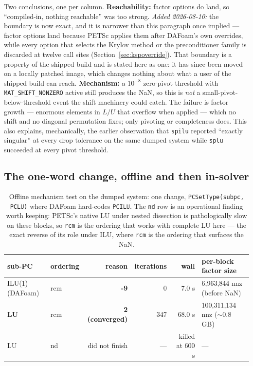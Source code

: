\documentclass[11pt,a4paper]{article}
\begin{document}
Two conclusions, one per column. \textbf{Reachability:} factor options do land, so
``compiled-in, nothing reachable'' was too strong. \emph{Added 2026-08-10:} the boundary is now
exact, and it is narrower than this paragraph once implied --- factor options land because
PETSc applies them after DAFoam's own overrides, while every option that selects the Krylov
method or the preconditioner family is discarded at twelve call sites
(Section~\ref{sec:kspoverride}). That boundary is a property of the shipped build and is stated
here as one: it has since been moved on a locally patched image, which changes nothing about
what a user of the shipped build can reach. \textbf{Mechanism:} a \(10^{-8}\)
zero-pivot threshold with \texttt{MAT\_SHIFT\_NONZERO} active still produces the NaN, so this
is \emph{not} a small-pivot-below-threshold event the shift machinery could catch. The failure
is factor growth --- enormous elements in \(L/U\) that overflow when applied --- which no
shift and no diagonal permutation fixes; only pivoting or completeness does. This also
explains, mechanically, the earlier observation that \texttt{spilu} reported ``exactly
singular'' at every drop tolerance on the same dumped system while \texttt{splu} succeeded at
every pivot threshold.

\subsection{The one-word change, offline and then in-solver}

\begin{table}[htbp]
\centering\footnotesize
\begin{tabular}{@{}llrrrl@{}}
\toprule
sub-PC & ordering & reason & iterations & wall & per-block factor size \\
\midrule
ILU(1) (DAFoam) & rcm & \textbf{-9} & 0 & 7.0 s & 6{,}963{,}844 nnz (before NaN) \\
\textbf{LU} & rcm & \textbf{2 (converged)} & 347 & 68.0 s & 100{,}311{,}134 nnz ($\sim$0.8 GB) \\
LU & nd & did not finish & --- & killed at 600 s & --- \\
\bottomrule
\end{tabular}
\caption{Offline mechanism test on the dumped system: one change, \texttt{PCSetType(subpc,
PCLU)} where DAFoam hard-codes \texttt{PCILU}. The \texttt{nd} row is an operational finding
worth keeping: PETSc's native LU under nested dissection is pathologically slow on these
blocks, so \texttt{rcm} is the ordering that works with complete LU here --- the exact reverse
of its role under ILU, where \texttt{rcm} is the ordering that surfaces the NaN.}
\end{table}
\end{document}
